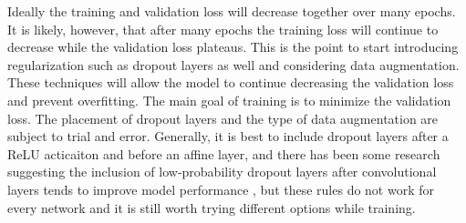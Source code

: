 Ideally the training and validation loss will decrease together over many epochs. It is likely, however, that after many epochs the training loss will continue to decrease while the validation loss plateaus. This is the point to start introducing regularization such as dropout layers as well and considering data augmentation. These techniques will allow the model to continue decreasing the validation loss and prevent overfitting. The main goal of training is to minimize the validation loss. The placement of dropout layers and the type of data augmentation are subject to trial and error. Generally, it is best to include dropout layers after a ReLU acticaiton and before an affine layer, and there has been some research suggesting the inclusion of low-probability dropout layers after convolutional layers tends to improve model performance \cite{conv-dropout-layers} \cite{conv-dropout-layers2}, but these rules do not work for every network and it is still worth trying different options while training.








